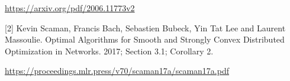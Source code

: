 \documentclass[10pt,a4paper]{article}
\begin{document}
\url{https://arxiv.org/pdf/2006.11773v2}

[2] Kevin Scaman, Francis Bach, Sebastien Bubeck, Yin Tat Lee and Laurent Massoulie. Optimal Algorithms for Smooth and Strongly Convex Distributed Optimization in Networks. 2017; Section 3.1; Corollary 2.

\url{https://proceedings.mlr.press/v70/scaman17a/scaman17a.pdf}
\end{document}
